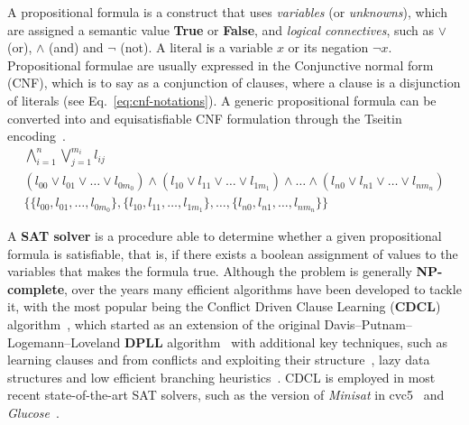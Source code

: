 \documentclass[runningheads]{llncs}
\begin{document}
A propositional formula is a construct that uses \textit{variables} (or \textit{unknowns}), which are assigned a semantic value \textbf{True} or \textbf{False}, and \textit{logical connectives}, such as $\lor$ (or), $\land$ (and) and $\neg$ (not).
A literal is a variable $x$ or its negation $\neg x$.
Propositional formulae are usually expressed in the Conjunctive normal form (CNF), which is to say as a conjunction of clauses, where a clause is a disjunction of literals (see Eq.~\ref{eq:cnf-notations}).
A generic propositional formula can be converted into and equisatisfiable CNF formulation through the Tseitin encoding~\cite{ref:handbook-sat}.
\begin{equation}
    \label{eq:cnf-notations}
    \begin{gathered}
        \bigwedge_{i=1}^n \bigvee_{j=1}^{m_i} l_{ij} \\
        ( l_{00} \lor l_{01} \lor \dots \lor l_{0m_0}) \land (l_{10} \lor l_{11} \lor \dots \lor l_{1m_1}) \land \dots \land (l_{n0} \lor l_{n1} \lor \dots \lor l_{nm_n}) \\
        \{ \{ l_{00}, l_{01} , \dots , l_{0m_0} \} , \{ l_{10} , l_{11} , \dots , l_{1m_1} \}, \dots , \{ l_{n0} , l_{n1} , \dots , l_{nm_n} \} \}
    \end{gathered}
\end{equation}

A \textbf{SAT solver} is a procedure able to determine whether a given propositional formula is satisfiable, that is, if there exists a boolean assignment of values to the variables that makes the formula true.
Although the problem is generally \textbf{NP-complete}, over the years many efficient algorithms have been developed to tackle it, with the most popular being the Conflict Driven Clause Learning (\textbf{CDCL}) algorithm~\cite{ref:handbook-sat}, which started as an extension of the original Davis–Putnam–Logemann–Loveland \textbf{DPLL} algorithm~\cite{ref:dpll} with additional key techniques, such as learning clauses and from conflicts and exploiting their structure~\cite{ref:conflict-driven-clause-learning}, lazy data structures and low efficient branching heuristics~\cite{ref:watched-literals}.
CDCL is employed in most recent state-of-the-art SAT solvers, such as the version of \textit{Minisat} in cvc5~\cite{ref:cvc5-smt-comp-2022} and \textit{Glucose}~\cite{ref:glucose}.
\end{document}
